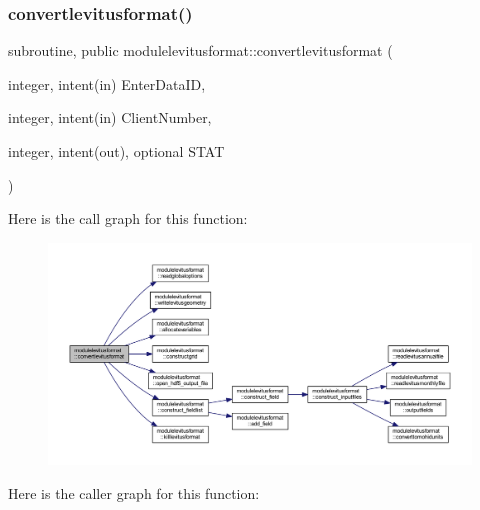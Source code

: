 \subsubsection{\texorpdfstring{convertlevitusformat()}{convertlevitusformat()}}
{\footnotesize\ttfamily subroutine, public modulelevitusformat\+::convertlevitusformat (\begin{DoxyParamCaption}\item[{integer, intent(in)}]{Enter\+Data\+ID,  }\item[{integer, intent(in)}]{Client\+Number,  }\item[{integer, intent(out), optional}]{S\+T\+AT }\end{DoxyParamCaption})}

Here is the call graph for this function\+:\nopagebreak
\begin{figure}[H]
\begin{center}
\leavevmode
\includegraphics[width=350pt]{namespacemodulelevitusformat_a7849fb124c87ab2b4867b47c45ae92db_cgraph}
\end{center}
\end{figure}
Here is the caller graph for this function\+:\nopagebreak

